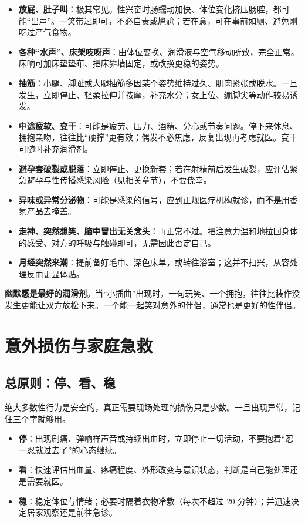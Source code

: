 \documentclass[12pt,UTF8]{ctexbook}
\newcommand{\keyword}[1]{\textbf{#1}}
\begin{document}
\begin{itemize}
	\item \textbf{放屁、肚子叫}：极其常见。性兴奋时肠蠕动加快、体位变化挤压肠腔，都可能“出声”。一笑带过即可，不必自责或尴尬；若在意，可在事前如厕、避免刚吃过产气食物。
	\item \textbf{各种“水声”、床架吱呀声}：由体位变换、润滑液与空气移动所致，完全正常。床响可加床垫垫布、把床靠墙固定，或改换更稳的姿势。
	\item \textbf{抽筋}：小腿、脚趾或大腿抽筋多因某个姿势维持过久、肌肉紧张或脱水。一旦发生，立即停止、轻柔拉伸并按摩，补充水分；女上位、绷脚尖等动作较易诱发。
	\item \textbf{中途疲软、变干}：可能是疲劳、压力、酒精、分心或节奏问题。停下来休息、拥抱亲吻，往往比“硬撑”更有效；偶发不必焦虑，反复出现再考虑就医。变干可随时补充润滑剂。
	\item \textbf{避孕套破裂或脱落}：立即停止、更换新套；若在射精前后发生破裂，应评估紧急避孕与性传播感染风险（见相关章节），不要侥幸。
	\item \textbf{异味或异常分泌物}：可能是感染的信号，应到正规医疗机构就诊，而\textbf{不是}用香氛产品去掩盖。
	\item \textbf{走神、突然想笑、脑中冒出无关念头}：再正常不过。把注意力温和地拉回身体的感受、对方的呼吸与触碰即可，无需因此否定自己。
	\item \textbf{月经突然来潮}：提前备好毛巾、深色床单，或转往浴室；这并不扫兴，从容处理反而更显体贴。
\end{itemize}

\begin{tcolorbox}[colback=pink!5!white,colframe=red!50!black,title=贴心小叮咛]
\textbf{幽默感是最好的润滑剂}。当“小插曲”出现时，一句玩笑、一个拥抱，往往比装作没发生更能让双方放松下来。一个能一起笑对意外的伴侣，通常也是更好的性伴侣。
\end{tcolorbox}

\section{意外损伤与家庭急救}
\subsection{总原则：停、看、稳}

绝大多数性行为是安全的，真正需要现场处理的损伤只是少数。一旦出现异常，记住三个字就够用。

\begin{itemize}
  \item \keyword{停}：出现剧痛、弹响样声音或持续出血时，立即停止一切活动，不要抱着“忍一忍就过去了”的心态继续。
  \item \keyword{看}：快速评估出血量、疼痛程度、外形改变与意识状态，判断是自己能处理还是需要就医。
  \item \keyword{稳}：稳定体位与情绪；必要时隔着衣物冷敷（每次不超过 20 分钟）；并迅速决定居家观察还是前往急诊。
\end{itemize}
\end{document}
